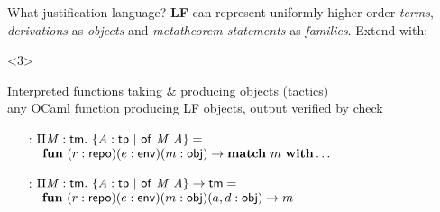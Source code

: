 \documentclass{beamer}
\theoremstyle{example}
\begin{document}
\begin{frame}{What justification language?}
  \textbf{LF} can represent uniformly higher-order \emph{terms},
  \emph{derivations} as \emph{objects} and \emph{metatheorem
    statements} as \emph{families}. \pause Extend with:
  \begin{overlayarea}\textwidth{18em}
    \begin{onlyenv}<3>
      \begin{block}{Interpreted functions} taking \& producing objects (tactics) \\
        {\footnotesize any OCaml function producing LF objects, output
          verified by \textsf{check}}
        \begin{example}
          \begin{enumerate}[inline]
          \item[\const{infer} :] $\Pi{\ensuremath{\text{\textit{M}}}}:{\text{\textsf{tm}}}.\ 
            \{{\text{\textit{A}}}:{\text{\textsf{tp}}}\ |\ {{\text{\textsf{of}}}\ {\text{\textit{M}}}\ {\text{\textit{A}}}}\} =$ \\
            {\small$\quad\mathbf{fun}\ (r : \text{\textsf{repo}}) (e :
              \text{\textsf{env}}) (m : \text{\textsf{obj}}) \to \mathbf{match}\ m\
              \mathbf{with} \ldots$}
            \\[1em]

          \item[\const{get} :] $\Pi{\ensuremath{\text{\textit{M}}}}:{\text{\textsf{tm}}}.\  \{{\text{\textit{A}}}:{\text{\textsf{tp}}}\ |\ {{\text{\textsf{of}}}\ {\text{\textit{M}}}\ {\text{\textit{A}}}}\}
            \to \text{\textsf{tm}}=$ \\
            {\small$\quad\mathbf{fun}\ (r : \text{\textsf{repo}}) (e :
              \text{\textsf{env}}) (m : \text{\textsf{obj}}) (a, d : \text{\textsf{obj}})\to m$}
            \\[1em]


\end{enumerate}
\end{example}
\end{block}
\end{onlyenv}
\end{overlayarea}
\end{frame}
\end{document}
